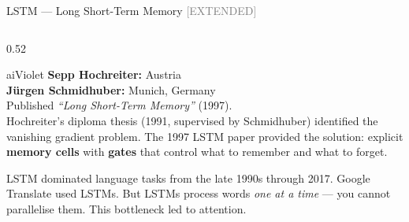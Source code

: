 \begin{frame}[shrink=17]{LSTM --- Long Short-Term Memory
  \hfill\small\textcolor{gray}{[EXTENDED]}}

  \begin{columns}[T]
    \begin{column}{0.52\textwidth}
      \begin{personbox}{aiViolet}
        \textbf{Sepp Hochreiter:} Austria\\
        \textbf{J\"urgen Schmidhuber:} Munich, Germany\\[3pt]
        Published \emph{``Long Short-Term Memory''} (1997).\\[3pt]
        Hochreiter's diploma thesis (1991, supervised by Schmidhuber)
        identified the vanishing gradient problem. The 1997 LSTM paper
        provided the solution: explicit \textbf{memory cells} with
        \textbf{gates} that control what to remember and what to forget.
      \end{personbox}

      \vspace{0.3em}
      \begin{insightbox}
        LSTM dominated language tasks from the late 1990s through 2017.
        Google Translate used LSTMs. But LSTMs process words
        \emph{one at a time} --- you cannot parallelise them.
        This bottleneck led to \alert{attention}.
      \end{insightbox}
    \end{column}


\end{columns}
\end{frame}

